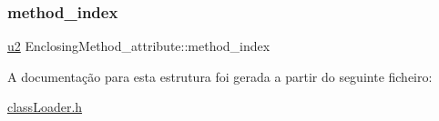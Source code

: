 \mbox{\label{struct_enclosing_method__attribute_a209cdae51c9033a08050a85c5581d481}} 
\subsubsection{\texorpdfstring{method\+\_\+index}{method\_index}}
{\footnotesize\ttfamily \hyperlink{util_8h_a55ef8d87fd202b8417704c089899c5b9}{u2} Enclosing\+Method\+\_\+attribute\+::method\+\_\+index}



A documentação para esta estrutura foi gerada a partir do seguinte ficheiro\+:\begin{DoxyCompactItemize}
\item 
\hyperlink{class_loader_8h}{class\+Loader.\+h}\end{DoxyCompactItemize}
